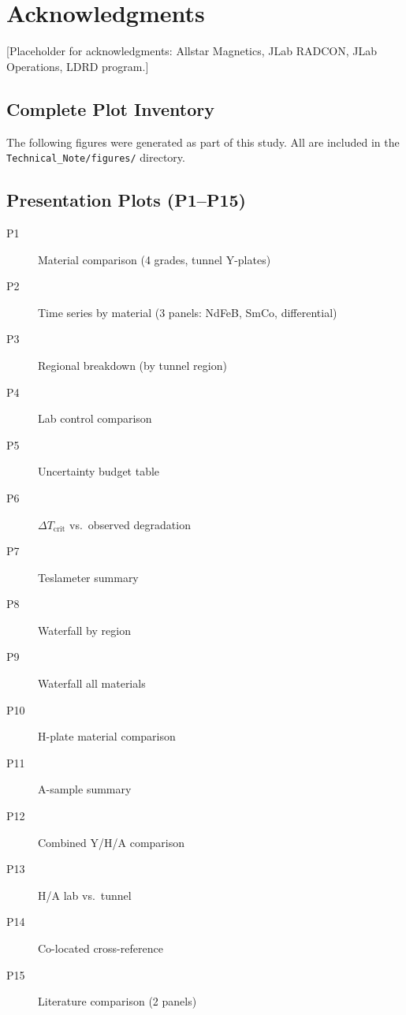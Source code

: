 \documentclass[11pt,letterpaper]{article}
\begin{document}
\section*{Acknowledgments}

[Placeholder for acknowledgments: Allstar Magnetics, JLab RADCON, JLab Operations, LDRD program.]

\newpage
\begin{appendices}

\section{Complete Plot Inventory}
\label{app:plots}

The following figures were generated as part of this study. All are included
in the \texttt{Technical\_Note/figures/} directory.

\subsection{Presentation Plots (P1--P15)}
\begin{description}
    \item[P1] Material comparison (4 grades, tunnel Y-plates)
    \item[P2] Time series by material (3 panels: NdFeB, SmCo, differential)
    \item[P3] Regional breakdown (by tunnel region)
    \item[P4] Lab control comparison
    \item[P5] Uncertainty budget table
    \item[P6] $\Delta T_\mathrm{crit}$ vs.\ observed degradation
    \item[P7] Teslameter summary
    \item[P8] Waterfall by region
    \item[P9] Waterfall all materials
    \item[P10] H-plate material comparison
    \item[P11] A-sample summary
    \item[P12] Combined Y/H/A comparison
    \item[P13] H/A lab vs.\ tunnel
    \item[P14] Co-located cross-reference
    \item[P15] Literature comparison (2 panels)
\end{description}


\end{appendices}
\end{document}
